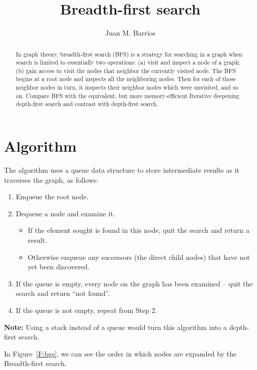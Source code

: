 \documentclass{article}
\title{Breadth-first search}
\author{Juan M. Barrios}
\begin{document}
  \maketitle

  \begin{abstract}
    In graph theory, breadth-first search (BFS) is a strategy for searching in a graph when search is limited to essentially two operations: (a) visit and inspect a node of a graph; (b) gain access to visit the nodes that neighbor the currently visited node. The BFS begins at a root node and inspects all the neighboring nodes. Then for each of those neighbor nodes in turn, it inspects their neighbor nodes which were unvisited, and so on. Compare BFS with the equivalent, but more memory-efficient Iterative deepening depth-first search and contrast with depth-first search.
  \end{abstract}

  \tableofcontents

\section{Algorithm}

  The algorithm uses a queue data structure to store intermediate results as it traverses the graph, as follows:
  \begin{enumerate}
    \item Enqueue the root node.
    \item Dequeue a node and examine it.
    \begin{itemize}
      \item If the element sought is found in this node, quit the search and return a result.
      \item Otherwise enqueue any successors (the direct child nodes) that have not yet been discovered.
    \end{itemize}
    \item If the queue is empty, every node on the graph has been examined – quit the search and return ``not found''.
    \item If the queue is not empty, repeat from Step 2.
  \end{enumerate}
  \textbf{Note:} Using a stack instead of a queue would turn this algorithm into a depth-first search.

  In Figure~\ref{F:bgs}, we can see the order in which nodes are expanded by the Breadth-first search.
\end{document}
